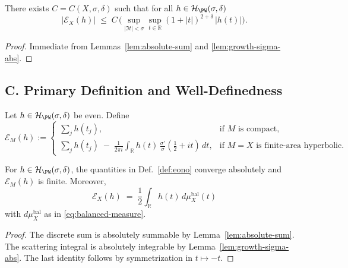 \begin{lemma}
\label{lem:boundedness}
There exists $C=C(X,\sigma,\delta)$ such that for all $h\in\mathcal H_{\PW}(\sigma,\delta)$
\[
  |\mathcal E_X(h)| \;\le\; C\,
   \Big(\sup_{|\Im t|<\sigma}\sup_{t\in\mathbb R} (1+|t|)^{2+\delta}\,|h(t)|\Big).
\]
\end{lemma}

\begin{proof}
Immediate from Lemmas~\ref{lem:absolute-sum} and \ref{lem:growth-sigma-abs}.
\end{proof}


\subsection*{C. Primary Definition and Well-Definedness}
\label{subsec:primary-def}

\begin{definition}
\label{def:eono}
Let $h\in\mathcal H_{\PW}(\sigma,\delta)$ be even. Define
\[
  \mathcal E_M(h):=
  \begin{cases}
    \displaystyle \sum_{j} h(t_j), & \text{if $M$ is compact},\\[1.25ex]
    \displaystyle \sum_{j} h(t_j) \;-\; \frac{1}{2\pi i}\int_{\mathbb R} h(t)\,\frac{\sigma'}{\sigma}\!\left(\tfrac12+it\right)\,dt, & \text{if $M=X$ is finite-area hyperbolic}.
  \end{cases}
\]
\end{definition}

\begin{proposition}
\label{prop:welldefined}
For $h\in\mathcal H_{\PW}(\sigma,\delta)$, the quantities in Def.~\ref{def:eono} converge absolutely and $\mathcal E_M(h)$ is finite. Moreover,
\[
  \mathcal E_X(h) \;=\; \frac12\int_{\mathbb R} h(t)\,d\mu_X^{\mathrm{bal}}(t)
\]
with $d\mu_X^{\mathrm{bal}}$ as in \eqref{eq:balanced-measure}.
\end{proposition}

\begin{proof}
The discrete sum is absolutely summable by Lemma~\ref{lem:absolute-sum}. The scattering integral is absolutely integrable by Lemma~\ref{lem:growth-sigma-abs}. The last identity follows by symmetrization in $t\mapsto -t$.
\end{proof}

